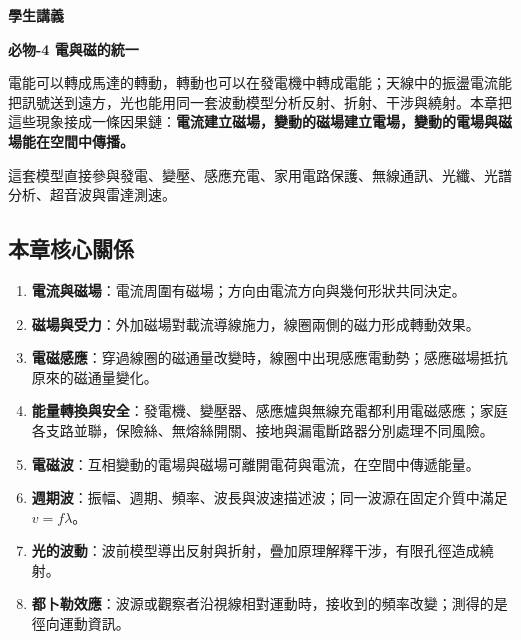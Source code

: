 \documentclass[11pt,a4paper]{article}
\providecommand{\tightlist}{%
  \setlength{\itemsep}{0pt}\setlength{\parskip}{0pt}}
\begin{document}
\begin{tcolorbox}[
  enhanced,colback=white,colframe=HandoutBlue,boxrule=1.1pt,arc=2mm,
  borderline west={3pt}{0pt}{HandoutBlue},left=5mm,right=4mm,top=4mm,bottom=4mm
]
{\sffamily\small\bfseries\color{HandoutBlue}學生講義}\par
{\sffamily\bfseries\LARGE\color{HandoutInk}必物-4 電與磁的統一}\par
\vspace{0.35em}{\large 從電流與磁場、波前與光路，建立發電、通訊、光學與測速的共同模型}\par
{}\par
{}\par
\end{tcolorbox}


電能可以轉成馬達的轉動，轉動也可以在發電機中轉成電能；天線中的振盪電流能把訊號送到遠方，光也能用同一套波動模型分析反射、折射、干涉與繞射。本章把這些現象接成一條因果鏈：\textbf{電流建立磁場，變動的磁場建立電場，變動的電場與磁場能在空間中傳播。}

這套模型直接參與發電、變壓、感應充電、家用電路保護、無線通訊、光纖、光譜分析、超音波與雷達測速。

\begin{HandoutLearningMap}

\subsection{本章核心關係}\label{ux672cux7ae0ux6838ux5fc3ux95dcux4fc2}

\begin{enumerate}
\def\labelenumi{\arabic{enumi}.}
\tightlist
\item
  \textbf{電流與磁場}：電流周圍有磁場；方向由電流方向與幾何形狀共同決定。
\item
  \textbf{磁場與受力}：外加磁場對載流導線施力，線圈兩側的磁力形成轉動效果。
\item
  \textbf{電磁感應}：穿過線圈的磁通量改變時，線圈中出現感應電動勢；感應磁場抵抗原來的磁通量變化。
\item
  \textbf{能量轉換與安全}：發電機、變壓器、感應爐與無線充電都利用電磁感應；家庭各支路並聯，保險絲、無熔絲開關、接地與漏電斷路器分別處理不同風險。
\item
  \textbf{電磁波}：互相變動的電場與磁場可離開電荷與電流，在空間中傳遞能量。
\item
  \textbf{週期波}：振幅、週期、頻率、波長與波速描述波；同一波源在固定介質中滿足 \(v=f\lambda\)。
\item
  \textbf{光的波動}：波前模型導出反射與折射，疊加原理解釋干涉，有限孔徑造成繞射。
\item
  \textbf{都卜勒效應}：波源或觀察者沿視線相對運動時，接收到的頻率改變；測得的是徑向運動資訊。
\end{enumerate}

\end{HandoutLearningMap}
\end{document}
